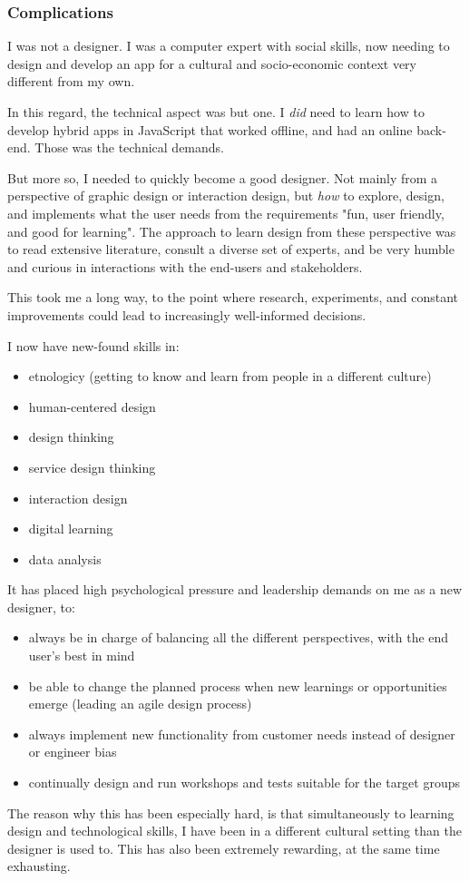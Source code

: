 \subsubsection{Complications}
I was not a designer. I was a computer expert with social skills, now needing to design and develop an app for a cultural and socio-economic context very different from my own.

In this regard, the technical aspect was but one. I \textit{did} need to learn how to develop hybrid apps in JavaScript that worked offline, and had an online back-end. Those was the technical demands.

But more so, I needed to quickly become a good designer. Not mainly from a perspective of graphic design or interaction design, but \textit{how} to explore, design, and implements what the user needs from the requirements "fun, user friendly, and good for learning". The approach to learn design from these perspective was to read extensive literature, consult a diverse set of experts, and be very humble and curious in interactions with the end-users and stakeholders.

This took me a long way, to the point where research, experiments, and constant improvements could lead to increasingly well-informed decisions.

I now have new-found skills in:
\begin{itemize}
\item etnologicy (getting to know and learn from people in a different culture)
\item human-centered design
\item design thinking
\item service design thinking
\item interaction design
\item digital learning
\item data analysis
\end{itemize}

It has placed high psychological pressure and leadership demands on me as a new designer, to:
\begin{itemize}
\item always be in charge of balancing all the different perspectives, with the end user's best in mind
\item be able to change the planned process when new learnings or opportunities emerge (leading an agile design process)
\item always implement new functionality from customer needs instead of designer or engineer bias
\item continually design and run workshops and tests suitable for the target groups
\end{itemize}

The reason why this has been especially hard, is that simultaneously to learning design and technological skills, I have been in a different cultural setting than the designer is used to. This has also been extremely rewarding, at the same time exhausting.
